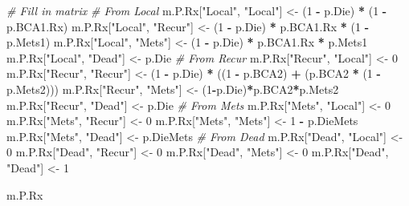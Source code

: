 \documentclass[]{article}
\newenvironment{Shaded}{\begin{snugshade}}{\end{snugshade}}
\newcommand{\DecValTok}[1]{\textcolor[rgb]{0.00,0.00,0.81}{#1}}
\newcommand{\StringTok}[1]{\textcolor[rgb]{0.31,0.60,0.02}{#1}}
\newcommand{\CommentTok}[1]{\textcolor[rgb]{0.56,0.35,0.01}{\textit{#1}}}
\newcommand{\OperatorTok}[1]{\textcolor[rgb]{0.81,0.36,0.00}{\textbf{#1}}}
\newcommand{\NormalTok}[1]{#1}
\theoremstyle{definition}
\theoremstyle{definition}
\theoremstyle{definition}
\theoremstyle{remark}
\begin{document}
\begin{Shaded}
\begin{Highlighting}[]
\CommentTok{# Fill in matrix}
\CommentTok{# From Local}
\NormalTok{m.P.Rx[}\StringTok{"Local"}\NormalTok{, }\StringTok{"Local"}\NormalTok{] <-}\StringTok{ }\NormalTok{(}\DecValTok{1} \OperatorTok{-}\StringTok{ }\NormalTok{p.Die) }\OperatorTok{*}\StringTok{ }\NormalTok{(}\DecValTok{1} \OperatorTok{-}\StringTok{ }\NormalTok{p.BCA1.Rx)}
\NormalTok{m.P.Rx[}\StringTok{"Local"}\NormalTok{, }\StringTok{"Recur"}\NormalTok{] <-}\StringTok{ }\NormalTok{(}\DecValTok{1} \OperatorTok{-}\StringTok{ }\NormalTok{p.Die) }\OperatorTok{*}\StringTok{ }\NormalTok{p.BCA1.Rx }\OperatorTok{*}\StringTok{ }\NormalTok{(}\DecValTok{1} \OperatorTok{-}\StringTok{ }\NormalTok{p.Mets1) }
\NormalTok{m.P.Rx[}\StringTok{"Local"}\NormalTok{, }\StringTok{"Mets"}\NormalTok{]  <-}\StringTok{ }\NormalTok{(}\DecValTok{1} \OperatorTok{-}\StringTok{ }\NormalTok{p.Die) }\OperatorTok{*}\StringTok{ }\NormalTok{p.BCA1.Rx }\OperatorTok{*}\StringTok{ }\NormalTok{p.Mets1}
\NormalTok{m.P.Rx[}\StringTok{"Local"}\NormalTok{, }\StringTok{"Dead"}\NormalTok{]  <-}\StringTok{ }\NormalTok{p.Die}
\CommentTok{# From Recur}
\NormalTok{m.P.Rx[}\StringTok{"Recur"}\NormalTok{, }\StringTok{"Local"}\NormalTok{] <-}\StringTok{ }\DecValTok{0}
\NormalTok{m.P.Rx[}\StringTok{"Recur"}\NormalTok{, }\StringTok{"Recur"}\NormalTok{] <-}\StringTok{ }\NormalTok{(}\DecValTok{1} \OperatorTok{-}\StringTok{ }\NormalTok{p.Die) }\OperatorTok{*}\StringTok{ }\NormalTok{((}\DecValTok{1} \OperatorTok{-}\StringTok{ }\NormalTok{p.BCA2) }\OperatorTok{+}\StringTok{ }\NormalTok{(p.BCA2 }\OperatorTok{*}\StringTok{ }\NormalTok{(}\DecValTok{1} \OperatorTok{-}\StringTok{ }\NormalTok{p.Mets2)))}
\NormalTok{m.P.Rx[}\StringTok{"Recur"}\NormalTok{, }\StringTok{"Mets"}\NormalTok{]  <-}\StringTok{ }\NormalTok{(}\DecValTok{1}\OperatorTok{-}\NormalTok{p.Die)}\OperatorTok{*}\NormalTok{p.BCA2}\OperatorTok{*}\NormalTok{p.Mets2}
\NormalTok{m.P.Rx[}\StringTok{"Recur"}\NormalTok{, }\StringTok{"Dead"}\NormalTok{]  <-}\StringTok{ }\NormalTok{p.Die}
\CommentTok{# From Mets}
\NormalTok{m.P.Rx[}\StringTok{"Mets"}\NormalTok{, }\StringTok{"Local"}\NormalTok{]  <-}\StringTok{ }\DecValTok{0}
\NormalTok{m.P.Rx[}\StringTok{"Mets"}\NormalTok{, }\StringTok{"Recur"}\NormalTok{]  <-}\StringTok{ }\DecValTok{0}
\NormalTok{m.P.Rx[}\StringTok{"Mets"}\NormalTok{, }\StringTok{"Mets"}\NormalTok{]   <-}\StringTok{ }\DecValTok{1} \OperatorTok{-}\StringTok{ }\NormalTok{p.DieMets}
\NormalTok{m.P.Rx[}\StringTok{"Mets"}\NormalTok{, }\StringTok{"Dead"}\NormalTok{]   <-}\StringTok{ }\NormalTok{p.DieMets}
\CommentTok{# From Dead}
\NormalTok{m.P.Rx[}\StringTok{"Dead"}\NormalTok{, }\StringTok{"Local"}\NormalTok{]  <-}\StringTok{ }\DecValTok{0}
\NormalTok{m.P.Rx[}\StringTok{"Dead"}\NormalTok{, }\StringTok{"Recur"}\NormalTok{]  <-}\StringTok{ }\DecValTok{0}
\NormalTok{m.P.Rx[}\StringTok{"Dead"}\NormalTok{, }\StringTok{"Mets"}\NormalTok{]   <-}\StringTok{ }\DecValTok{0}
\NormalTok{m.P.Rx[}\StringTok{"Dead"}\NormalTok{, }\StringTok{"Dead"}\NormalTok{]   <-}\StringTok{ }\DecValTok{1}

\NormalTok{m.P.Rx}
\end{Highlighting}
\end{Shaded}
\end{document}
